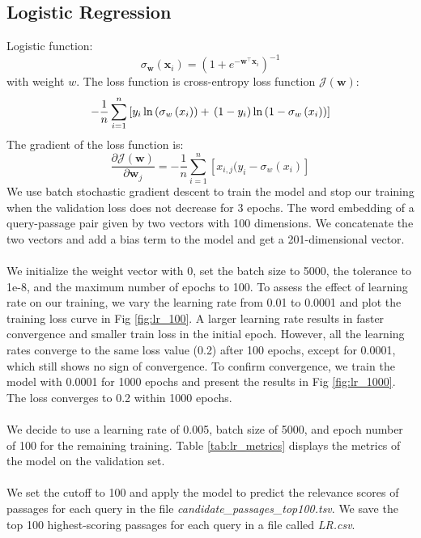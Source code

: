 \subsection{Logistic Regression}
Logistic function:
\begin{equation}
\sigma_{\mathbf{w}}\left(\mathbf{x}_i\right)=\left(1+e^{-\mathbf{w}^{\top} \mathbf{x}_i}\right)^{-1}
\end{equation}
with weight $w$. The loss function is cross-entropy loss function $\mathcal{J}(\mathbf{w})$:
\begin{equation}
-\frac{1}{n} \sum_{i=1}^n\left[y_i \ln \left(\sigma_w\left(x_i\right)\right)+ \\
\left(1-y_i\right) \ln \left(1-\sigma_w\left(x_i\right)\right)\right]
\end{equation}
The gradient of the loss function is:
\begin{equation}
\frac{\partial \mathcal{J}(\mathbf{w})}{\partial \mathbf{w}_j} = -\frac{1}{n} \sum_{i=1}^n\left[x_{i, j}(y_i-\sigma_w\left(x_i\right)\right]
\end{equation}
We use batch stochastic gradient descent to train the model and stop our training when the validation loss does not decrease for 3 epochs. The word embedding of a query-passage pair given by two vectors with 100 dimensions. We concatenate the two vectors and add a bias term to the model and get a 201-dimensional vector.
\\\\
We initialize the weight vector with 0, set the batch size to 5000, the tolerance to 1e-8, and the maximum number of epochs to 100. To assess the effect of learning rate on our training, we vary the learning rate from 0.01 to 0.0001 and plot the training loss curve in Fig \ref{fig:lr_100}. A larger learning rate results in faster convergence and smaller train loss in the initial epoch. However, all the learning rates converge to the same loss value (0.2) after 100 epochs, except for 0.0001, which still shows no sign of convergence. To confirm convergence, we train the model with 0.0001 for 1000 epochs and present the results in Fig \ref{fig:lr_1000}. The loss converges to 0.2 within 1000 epochs.
\\\\
We decide to use a learning rate of 0.005, batch size of 5000, and epoch number of 100 for the remaining training. Table \ref{tab:lr_metrics} displays the metrics of the model on the validation set.
\\\\
We set the cutoff to 100 and apply the model to predict the relevance scores of passages for each query in the file \textsl{candidate\_passages\_top100.tsv}. We save the top 100 highest-scoring passages for each query in a file called \textsl{LR.csv}.

